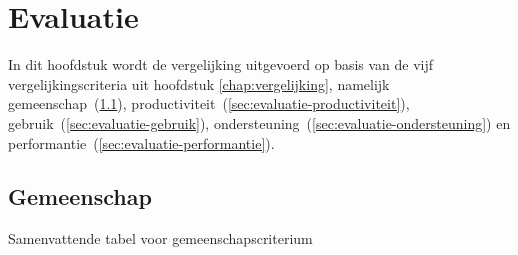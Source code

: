 \chapter{Evaluatie}
\label{chap:evaluatie}

In dit hoofdstuk wordt de vergelijking uitgevoerd op basis van de vijf vergelijkingscriteria uit hoofdstuk \ref{chap:vergelijking}, namelijk gemeenschap~(\ref{sec:evaluatie-gemeenschap}), productiviteit~(\ref{sec:evaluatie-productiviteit}), gebruik~(\ref{sec:evaluatie-gebruik}), ondersteuning~(\ref{sec:evaluatie-ondersteuning}) en performantie~(\ref{sec:evaluatie-performantie}). 


\section{Gemeenschap}
\label{sec:evaluatie-gemeenschap}



\begin{table}[H]
\centering
{}
\caption{Samenvattende tabel voor gemeenschapscriterium}
\label{tabel:evaluatie-gemeenschap}
\end{table}


